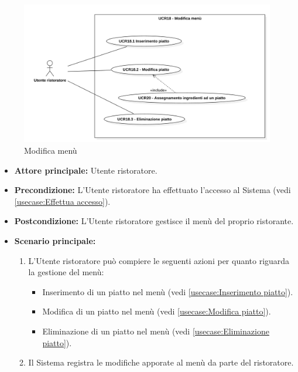 \label{usecase:Modifica menù}


\begin{figure}[h]
	\centering
	\includegraphics[width=0.99\textwidth]{./uml/UCR18.png} 
	\caption{Modifica menù}
	\label{fig:UCR18}
  \end{figure}

\begin{itemize}
	\item \textbf{Attore principale:} Utente ristoratore.

	\item \textbf{Precondizione:} L'Utente ristoratore ha effettuato l'accesso al Sistema (vedi \autoref{usecase:Effettua accesso}).

	\item \textbf{Postcondizione:} L'Utente ristoratore gestisce il menù del proprio ristorante.


	\item \textbf{Scenario principale:}
	      \begin{enumerate}

		      \item L'Utente ristoratore può compiere le seguenti azioni per quanto riguarda la gestione del menù:
		      \begin{itemize}
                \item Inserimento di un piatto nel menù (vedi \autoref{usecase:Inserimento piatto}).
                \item Modifica di un piatto nel menù (vedi \autoref{usecase:Modifica piatto}).
                \item Eliminazione di un piatto nel menù (vedi \autoref{usecase:Eliminazione piatto}).
              \end{itemize}
		      \item Il Sistema registra le modifiche apporate al menù da parte del ristoratore.

	      \end{enumerate}
\end{itemize}

